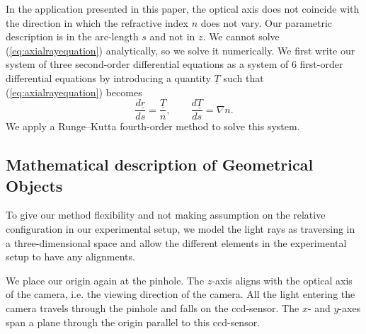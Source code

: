\documentclass[draft]{svjour3}                     %
\begin{document}
In the application presented in this paper, the optical axis does not coincide with the direction in which the refractive index $n$ does not vary. Our parametric description is in the arc-length $s$ and not in $z$.  We cannot solve (\ref{eq:axialrayequation}) analytically, so we solve it numerically. We first write our system of three second-order differential equations as a system of 6 first-order differential equations by introducing a quantity $\underline{T}$ \cite{southwell1982ray} such that (\ref{eq:axialrayequation}) becomes
\begin{equation}
	\label{eq:sys6foeq}
		\frac{d \underline{r}}{d s} = \frac{\underline{T}}{n}, \qquad
		\frac{d \underline{T}}{d s} = \nabla n.
\end{equation}
We apply a Runge–Kutta fourth-order method to solve this system. %

\subsection{Mathematical description of Geometrical Objects}
\label{subsec:RayPath}
To give our method flexibility and not making assumption on the relative configuration in our experimental setup, we model the light rays as traversing in a three-dimensional space and allow the different elements in the experimental setup to have any alignments.

We place our origin again at the pinhole. The $z$-axis aligns with the optical axis of the camera, i.e. the viewing direction of the camera. All the light entering the camera travels through the pinhole and falls on the ccd-sensor. The $x$- and $y$-axes span a plane through the origin parallel to this ccd-sensor. 
\end{document}

